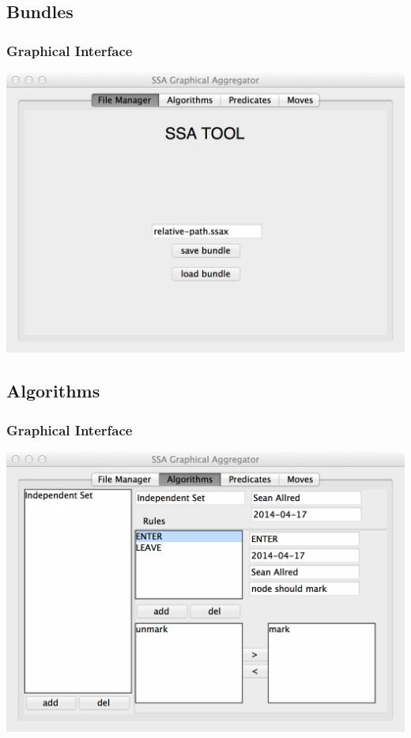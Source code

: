 \documentclass[
]{beamer}
\begin{document}
\subsection{Bundles}
\begin{frame}
  \frametitle{Graphical Interface}
  \centering
  \includegraphics[width=\textwidth]{../figs/3-2}
\end{frame}

\subsection{Algorithms}
\begin{frame}
  \frametitle{Graphical Interface}
  \centering
  \includegraphics[width=\textwidth]{../figs/4}
\end{frame}
\end{document}
